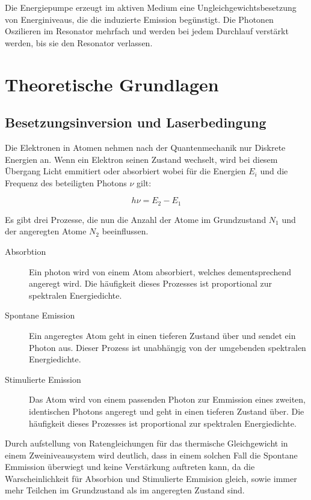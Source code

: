 \documentclass[slug=GL, room=HZDR\ Dresden/Rossendorf\,\ Geb.\ 620/123, supervisor=Martin\ Rehwald;\, Tim\ Ziegler]{../../Lab_Report_LaTeX/lab_report}
\begin{document}
Die Energiepumpe erzeugt im aktiven Medium eine
Ungleichgewichtsbesetzung von Energiniveaus, die die induzierte
Emission beg\"unstigt. Die Photonen Oszilieren im Resonator mehrfach
und werden bei jedem Durchlauf verst\"arkt werden, bis sie den
Resonator verlassen.

\section{Theoretische Grundlagen}%
\label{sec:theo}

\subsection{Besetzungsinversion und Laserbedingung}%
\label{sec:inv}

Die Elektronen in Atomen nehmen nach der Quantenmechanik nur Diskrete
Energien an. Wenn ein Elektron seinen Zustand wechselt, wird bei
diesem \"Ubergang Licht emmitiert oder absorbiert wobei f\"ur die
Energien \(E_i\) und die Frequenz des beteiligten Photons \(\nu\) gilt:

\begin{equation}
  \label{eq:transfreq}
  h\nu = E_2 - E_1
\end{equation}

Es gibt drei Prozesse, die nun die Anzahl der Atome im Grundzustand
\(N_1\) und der angeregten Atome \(N_2\) beeinflussen.

\begin{description}
\item[Absorbtion] Ein photon wird von einem Atom absorbiert, welches
  dementsprechend angeregt wird. Die h\"aufigkeit dieses Prozesses ist
  proportional zur spektralen Energiedichte.
\item[Spontane Emission] Ein angeregtes Atom geht in einen tieferen
  Zustand \"uber und sendet ein Photon aus. Dieser Prozess ist
  unabh\"angig von der umgebenden spektralen Energiedichte.
\item[Stimulierte Emission] Das Atom wird von einem passenden Photon
  zur Emmission eines zweiten, identischen Photons angeregt und geht
  in einen tieferen Zustand \"uber. Die h\"aufigkeit dieses Prozesses ist
  proportional zur spektralen Energiedichte.
\end{description}

Durch aufstellung von Ratengleichungen f\"ur das thermische
Gleichgewicht in einem Zweiniveausystem wird deutlich, dass in einem
solchen Fall die Spontane Emmission \"uberwiegt und keine
Verst\"arkung auftreten kann, da die Warscheinlichkeit f\"ur Absorbion
und Stimulierte Emmision gleich, sowie immer mehr Teilchen im
Grundzustand als im angeregten Zustand sind.
\end{document}
